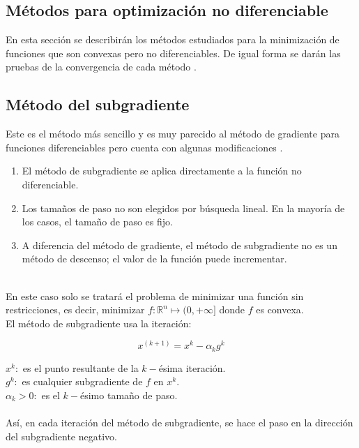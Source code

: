 \subsection{Métodos para optimización no diferenciable}

En esta secci\'on se describir\'an los m\'etodos estudiados para la minimizaci\'on de funciones que son convexas pero no diferenciables. De 
igual forma se dar\'an las pruebas de la convergencia de cada m\'etodo \cite{intro}.\\

\subsection{M\'etodo del subgradiente}

Este es el m\'etodo m\'as sencillo y es muy parecido al m\'etodo de gradiente para funciones diferenciables pero cuenta con algunas
modificaciones \cite{intro}.\medskip

\begin{enumerate}
   \item El m\'etodo de subgradiente se aplica directamente a la funci\'on no diferenciable.
   \item Los tamaños de paso no son elegidos por b\'usqueda lineal. En la mayor\'ia de los casos, el tamaño de paso es fijo.
   \item A diferencia del m\'etodo de gradiente, el m\'etodo de subgradiente no es un m\'etodo de descenso; el valor de la funci\'on puede
	 incrementar.
\end{enumerate}
~ \\

En este caso solo se tratar\'a el problema de minimizar una funci\'on sin restricciones, es decir, minimizar $f: \mathbb{R}^n \longmapsto (0, 
+ \infty] $ donde $ f $ es convexa.\\
El m\'etodo de subgradiente usa la iteraci\'on:

\[x^{(k + 1)} = x^k - \alpha_k g^k\]

$x^k: $ es el punto resultante de la $k-$\'esima iteraci\'on.\\
$g^k: $ es cualquier subgradiente de $f $ en $x^k.$\\
$\alpha_k > 0: $ es el $k-$\'esimo tama\~no de paso.\\ \\

As\'i, en cada iteraci\'on del m\'etodo de subgradiente, se hace el paso en la direcci\'on del subgradiente negativo.\medskip

